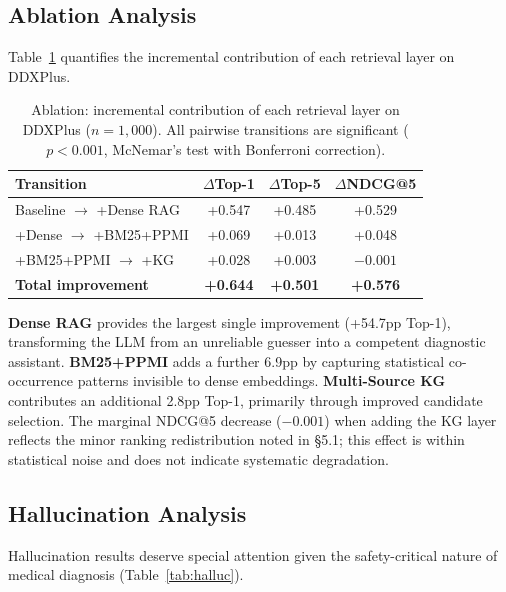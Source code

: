 \documentclass[runningheads]{llncs}
\begin{document}
\subsection{Ablation Analysis}
\label{sec:ablation}

Table~\ref{tab:ablation} quantifies the incremental contribution of each retrieval layer on DDXPlus.

\begin{table}[t]
\centering
\caption{Ablation: incremental contribution of each retrieval layer on DDXPlus ($n{=}1{,}000$). All pairwise transitions are significant ($p < 0.001$, McNemar's test with Bonferroni correction).}
\label{tab:ablation}
\begin{tabular}{lccc}
\toprule
\textbf{Transition} & \textbf{$\Delta$Top-1} & \textbf{$\Delta$Top-5} & \textbf{$\Delta$NDCG@5} \\
\midrule
Baseline $\to$ +Dense RAG    & +0.547 & +0.485 & +0.529 \\
+Dense $\to$ +BM25+PPMI      & +0.069 & +0.013 & +0.048 \\
+BM25+PPMI $\to$ +KG         & +0.028 & +0.003 & $-0.001$ \\
\midrule
\textbf{Total improvement}   & \textbf{+0.644} & \textbf{+0.501} & \textbf{+0.576} \\
\bottomrule
\end{tabular}
\end{table}

\textbf{Dense RAG} provides the largest single improvement (+54.7pp Top-1), transforming the LLM from an unreliable guesser into a competent diagnostic assistant. \textbf{BM25+PPMI} adds a further 6.9pp by capturing statistical co-occurrence patterns invisible to dense embeddings. \textbf{Multi-Source KG} contributes an additional 2.8pp Top-1, primarily through improved candidate selection. The marginal NDCG@5 decrease ($-0.001$) when adding the KG layer reflects the minor ranking redistribution noted in \S5.1; this effect is within statistical noise and does not indicate systematic degradation.

\subsection{Hallucination Analysis}
\label{sec:hallucination}

Hallucination results deserve special attention given the safety-critical nature of medical diagnosis (Table~\ref{tab:halluc}).
\end{document}
